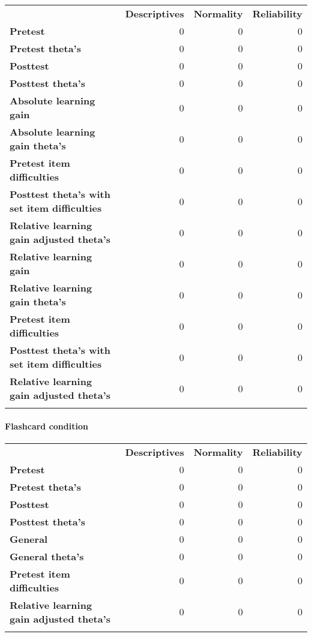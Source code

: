\begin{longtable}[c]{@{}lrrr@{}}
\toprule\addlinespace
& \textbf{Descriptives} & \textbf{Normality} & \textbf{Reliability}
\\\addlinespace
\midrule\endhead
\textbf{Pretest} & 0 & 0 & 0
\\\addlinespace
\textbf{Pretest theta's} & 0 & 0 & 0
\\\addlinespace
\textbf{Posttest} & 0 & 0 & 0
\\\addlinespace
\textbf{Posttest theta's} & 0 & 0 & 0
\\\addlinespace
\textbf{Absolute learning gain} & 0 & 0 & 0
\\\addlinespace
\textbf{Absolute learning gain theta's} & 0 & 0 & 0
\\\addlinespace
\textbf{Pretest item difficulties} & 0 & 0 & 0
\\\addlinespace
\textbf{Posttest theta's with set item difficulties} & 0 & 0 & 0
\\\addlinespace
\textbf{Relative learning gain adjusted theta's} & 0 & 0 & 0
\\\addlinespace
\textbf{Relative learning gain} & 0 & 0 & 0
\\\addlinespace
\textbf{Relative learning gain theta's} & 0 & 0 & 0
\\\addlinespace
\textbf{Pretest item difficulties} & 0 & 0 & 0
\\\addlinespace
\textbf{Posttest theta's with set item difficulties} & 0 & 0 & 0
\\\addlinespace
\textbf{Relative learning gain adjusted theta's} & 0 & 0 & 0
\\\addlinespace
\bottomrule
\end{longtable}

\paragraph{Flashcard condition}\label{flashcard-condition-2}

\begin{longtable}[c]{@{}lrrr@{}}
\toprule\addlinespace
& \textbf{Descriptives} & \textbf{Normality} & \textbf{Reliability}
\\\addlinespace
\midrule\endhead
\textbf{Pretest} & 0 & 0 & 0
\\\addlinespace
\textbf{Pretest theta's} & 0 & 0 & 0
\\\addlinespace
\textbf{Posttest} & 0 & 0 & 0
\\\addlinespace
\textbf{Posttest theta's} & 0 & 0 & 0
\\\addlinespace
\textbf{General} & 0 & 0 & 0
\\\addlinespace
\textbf{General theta's} & 0 & 0 & 0
\\\addlinespace
\textbf{Pretest item difficulties} & 0 & 0 & 0
\\\addlinespace
\textbf{Relative learning gain adjusted theta's} & 0 & 0 & 0
\\\addlinespace
\bottomrule
\end{longtable}

